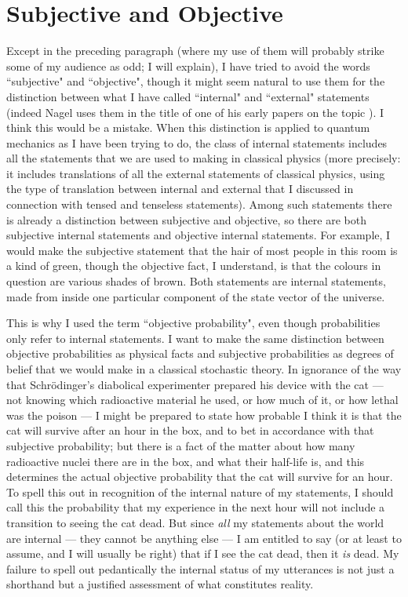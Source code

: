 \documentclass[12pt,a4paper,reqno]{article}
\renewcommand{\(}{\left(}
\renewcommand{\)}{\right)}
\newcommand{\<}{\langle}
\renewcommand{\>}{\rangle}
\theoremstyle{plain} %
\theoremstyle{definition}
\theoremstyle{remark}
\begin{document}
\medskip
\section{Subjective and Objective}


Except in the preceding paragraph (where my use of them will probably
strike some of my audience as odd; I will explain), I have tried to
avoid the words ``subjective" and ``objective", though it might seem
natural to use them for the distinction between what I have called
``internal" and ``external" statements (indeed Nagel uses them in
the title of one of his early papers on the topic \cite{Nagel:subjobj}).
I think this would be a mistake. When this distinction is applied to quantum
mechanics as I have been trying to do, the class of internal statements
includes all the statements that we are used to making in classical
physics (more precisely: it includes translations of all the external
statements of classical physics, using the type of translation between
internal and external that I discussed in connection with tensed and
tenseless statements). Among such statements there is already a
distinction between subjective and objective, so there are both
subjective internal statements and objective internal statements. For
example, I would make the subjective statement that the hair of most people in
this room is a kind of green, though the objective fact, I
understand, is that the colours in question are various shades of brown.
Both statements are internal statements, made from inside one particular
component of the state vector of the universe.

This is why I used the term ``objective probability", even though
probabilities only refer to internal statements. I want to make the same
distinction between objective probabilities as physical facts and
subjective probabilities as degrees of belief that we would make in a
classical stochastic theory. In ignorance of the way that
Schr\"odinger's diabolical experimenter prepared his device with the cat
--- not knowing which radioactive material he used, or how much of it,
or how lethal was the poison --- I might be prepared to state how
probable I think it is that the cat will survive after an hour in the
box, and to bet in accordance with that subjective probability; but
there is a fact of the matter about how many radioactive nuclei there
are in the box, and what their half-life is, and this determines the
actual objective probability that the cat will survive for an hour. To
spell this out in recognition of the internal nature of my statements, I
should call this the probability that my experience in the next hour
will not include a transition to seeing the cat dead. But since
\emph{all} my statements about the world are internal --- they cannot be
anything else --- I am entitled to say (or at least to assume, and I
will usually be right) that if I see the cat dead, then it \emph{is}
dead. My failure to spell out pedantically the internal status of my
utterances is not just a shorthand but a justified assessment of what
constitutes reality.
\end{document}
